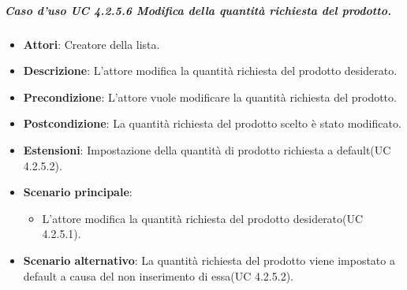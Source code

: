 	\subparagraph{Caso d'uso UC 4.2.5.6 Modifica della quantità richiesta del prodotto.}
	\begin{itemize}
		\item\textbf{Attori}: Creatore della lista.
		\item\textbf{Descrizione}: L'attore modifica la quantità richiesta del prodotto desiderato.
		\item\textbf{Precondizione}: L'attore vuole modificare la quantità richiesta del prodotto.
		\item\textbf{Postcondizione}: La quantità richiesta del prodotto scelto è stato modificato.
		\item\textbf{Estensioni}: Impostazione della quantità di prodotto richiesta a default(UC 4.2.5.2).
		\item\textbf{Scenario principale}:
			\begin{itemize}
				\item L'attore modifica la quantità richiesta del prodotto desiderato(UC 4.2.5.1). 
			\end{itemize}
		\item\textbf{Scenario alternativo}: La quantità richiesta  del prodotto viene impostato a default a causa del non inserimento di essa(UC 4.2.5.2).
		
	\end{itemize}
	
